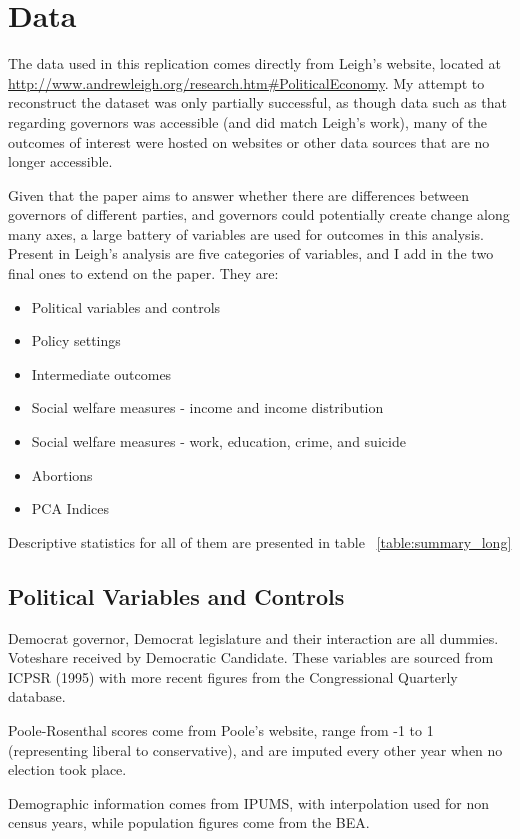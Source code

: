 \documentclass{article}
\begin{document}
\section{Data}

The data used in this replication comes directly from Leigh's website, located at \url{http://www.andrewleigh.org/research.htm#PoliticalEconomy}. My attempt to reconstruct the dataset was only partially successful, as though data such as that regarding governors was accessible (and did match Leigh's work), many of the outcomes of interest were hosted on websites or other data sources that are no longer accessible.

Given that the paper aims to answer whether there are differences between governors of different parties, and governors could potentially create change along many axes, a large battery of variables are used for outcomes in this analysis. Present in Leigh's analysis are five categories of variables, and I add in the two final ones to extend on the paper. They are:
\begin{itemize}
\item Political variables and controls
\item Policy settings
\item Intermediate outcomes
\item Social welfare measures - income and income distribution
\item Social welfare measures - work, education, crime, and suicide
\item Abortions
\item PCA Indices
\end{itemize}

Descriptive statistics for all of them are presented in table ~\ref{table:summary_long}

\subsection{Political Variables and Controls}

Democrat governor, Democrat legislature and their interaction are all dummies. Voteshare received by Democratic Candidate. These variables are sourced from ICPSR (1995) with more recent figures from the Congressional Quarterly database. 

Poole-Rosenthal scores come from Poole's website, range from -1 to 1 (representing liberal to conservative), and are imputed every other year when no election took place.

Demographic information comes from IPUMS, with interpolation used for non census years, while population figures come from the BEA.
\end{document}
